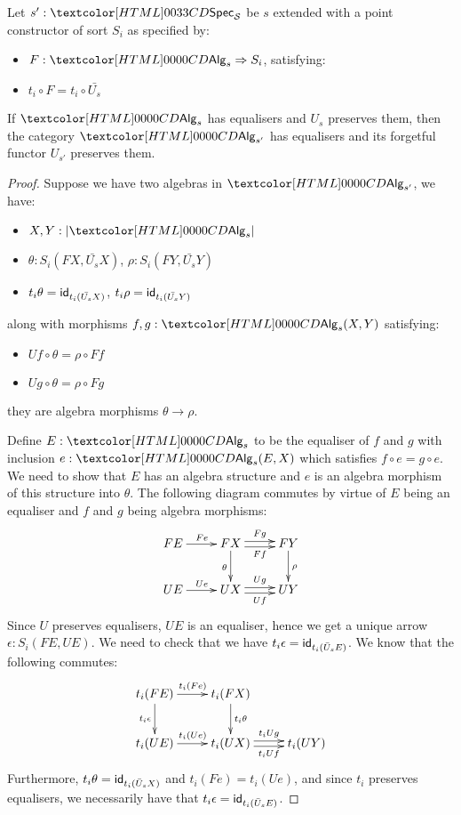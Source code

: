 \begin{lemma}
  Let $s' : \specty_\Ss$ be $s$ extended with a point constructor of sort
  $S_i$ as specified by:
  \begin{itemize}
  \item $F : \Func{\Alg_s}{S_i}$, satisfying:
  \item $t_i \circ F = t_i \circ \bar{U_s}$
  \end{itemize}

  If $\Alg_s$ has equalisers and $U_s$ preserves them, then the category
  $\Alg_{s'}$ has equalisers and its forgetful functor $U_{s'}$
  preserves them.
\end{lemma}

\begin{proof}
  Suppose we have two algebras in $\Alg_{s'}$, \ie we have:
  \begin{itemize}
  \item $X, Y : | \Alg_s |$
  \item $\theta : S_i(FX,\bar{U_s}X)$, $\rho : S_i(FY,\bar{U_s}Y)$
  \item $t_i \theta = \id_{t_i (\bar{U_s} X)}$, $t_i \rho = \id_{t_i (\bar{U_s} Y)}$
  \end{itemize}
  along with morphisms $f, g : \Alg_s(X,Y)$ satisfying:
  \begin{itemize}
  \item $Uf \circ \theta = \rho \circ Ff$
  \item $Ug \circ \theta = \rho \circ Fg$
  \end{itemize}
  \ie they are algebra morphisms $\theta \to \rho$.

  Define $E : \Alg_s$ to be the equaliser of $f$ and $g$ with
  inclusion $e : \Alg_s(E,X)$ which satisfies $f \circ e = g \circ e$.
  We need to show that $E$ has an algebra structure and $e$ is an
  algebra morphism of this structure into $\theta$. The following
  diagram commutes by virtue of $E$ being an equaliser and $f$ and $g$
  being algebra morphisms:
  $$
  \xymatrix{
    FE \ar[r]^{Fe} &FX \ar[d]_{\theta} \ar@<-.5ex>[r]_-{Ff} \ar@<.5ex>[r]^-{Fg} &FY \ar[d]^{\rho} \\
    UE \ar[r]^{Ue} &UX \ar@<-.5ex>[r]_-{Uf} \ar@<.5ex>[r]^-{Ug} &UY
  }
  $$
  Since $U$ preserves equalisers, $UE$ is an equaliser, hence we get a
  unique arrow $\epsilon : S_i(FE,UE)$. We need to check that we have
  $t_i \epsilon = \id_{t_i (\bar{U}_s E)}$. We know that the following
  commutes:
  $$
  \xymatrix{
    t_i (FE) \ar[r]^{t_i (Fe)} \ar[d]_{t_i \epsilon} &t_i (FX) \ar[d]^{t_i \theta} \\
    t_i (UE) \ar[r]^{t_i (Ue)} &t_i (UX) \ar@<-.5ex>[r]_-{t_i Uf} \ar@<.5ex>[r]^-{t_i Ug} &t_i (UY)
  }
  $$
  Furthermore, $t_i \theta = \id_{t_i (\bar{U}_s X)}$ and
  $t_i (Fe) = t_i (Ue)$, and since $t_i$ preserves equalisers, we
  necessarily have that $t_i \epsilon = \id_{t_i (\bar{U}_s E)}$.


\end{proof}
